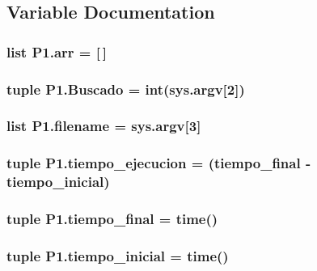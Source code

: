 \subsection{Variable Documentation}
\hypertarget{namespace_p1_a7f2505b01fc75fffebf9bce9b2a1a8ac}{
\subsubsection[{arr}]{\setlength{\rightskip}{0pt plus 5cm}list P1.\-arr = \mbox{[}$\,$\mbox{]}}}\label{namespace_p1_a7f2505b01fc75fffebf9bce9b2a1a8ac}
\hypertarget{namespace_p1_a543c41346e642d3a17a60d4bfcafa7b6}{
\subsubsection[{Buscado}]{\setlength{\rightskip}{0pt plus 5cm}tuple P1.\-Buscado = int(sys.\-argv\mbox{[}2\mbox{]})}}\label{namespace_p1_a543c41346e642d3a17a60d4bfcafa7b6}
\hypertarget{namespace_p1_afa130a12e0569461754de8108d62db4f}{
\subsubsection[{filename}]{\setlength{\rightskip}{0pt plus 5cm}list P1.\-filename = sys.\-argv\mbox{[}3\mbox{]}}}\label{namespace_p1_afa130a12e0569461754de8108d62db4f}
\hypertarget{namespace_p1_a4f8c0fcce1da06bd45a4b590ecf968e4}{
\subsubsection[{tiempo\-\_\-ejecucion}]{\setlength{\rightskip}{0pt plus 5cm}tuple P1.\-tiempo\-\_\-ejecucion = ({\bf tiempo\-\_\-final} -\/ {\bf tiempo\-\_\-inicial})}}\label{namespace_p1_a4f8c0fcce1da06bd45a4b590ecf968e4}
\hypertarget{namespace_p1_a422dc409623cdce42d5190c00f59d2df}{
\subsubsection[{tiempo\-\_\-final}]{\setlength{\rightskip}{0pt plus 5cm}tuple P1.\-tiempo\-\_\-final = time()}}\label{namespace_p1_a422dc409623cdce42d5190c00f59d2df}
\hypertarget{namespace_p1_a91d519a1fb95100fea7a63aaac72447c}{
\subsubsection[{tiempo\-\_\-inicial}]{\setlength{\rightskip}{0pt plus 5cm}tuple P1.\-tiempo\-\_\-inicial = time()}}\label{namespace_p1_a91d519a1fb95100fea7a63aaac72447c}
